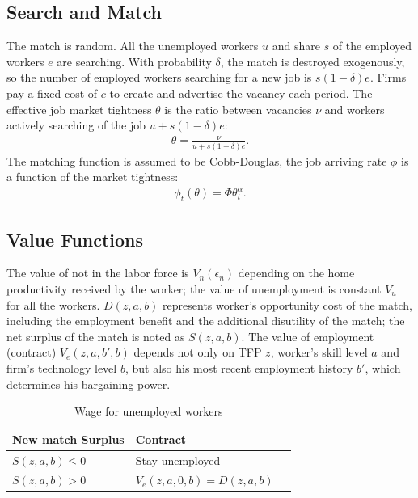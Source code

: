 \documentclass[12pt]{article}
\newcommand{\1}{\mathbb{1}}
\begin{document}
\subsection{Search and Match}
The match is random. All the unemployed workers $u$ and share $s$ of the employed workers $e$ are searching. With probability $\delta$, the match is destroyed exogenously, so the number of employed workers searching for a new job is $s(1-\delta)e$. Firms pay a fixed cost of $c$ to create and advertise the vacancy each period. 
The effective job market tightness $\theta$ is the ratio between vacancies $\nu$ and workers actively searching of the job $u+s(1-\delta)e$:
\begin{align*}
\theta = \frac{\nu}{u+s(1-\delta)e}.
\end{align*}
The matching function is assumed to be Cobb-Douglas, the job arriving rate $\phi$ is a function of the market tightness: 
\begin{align*}
\phi_t(\theta) = \Phi \theta_t^\alpha.
\end{align*}

\subsection{Value Functions}
The value of not in the labor force is $V_n(\epsilon_n)$ depending on the home productivity received by the worker; the value of unemployment is constant $V_u$ for all the workers. $D(z,a,b)$ represents worker's opportunity cost of the match, including the employment benefit and the additional disutility of the match; the net surplus of the match is noted as $S(z,a,b)$. The value of employment (contract) $V_e(z,a,b',b)$ depends not only on TFP $z$, worker's skill level $a$ and firm's technology level $b$, but also his most recent employment history $b'$, which determines his bargaining power. 

\begin{table}[h!]
\scriptsize
\begin{center}
\begin{tabular}{llc}
\hline \hline
New match Surplus & Contract  \\
\hline
$S(z,a,b) \leq 0$ &Stay unemployed \\
$S(z,a,b)>0$ &$V_e(z,a,0,b) = D(z,a,b)$ \\
\hline \hline
\end{tabular}
\end{center}
\caption{Wage for unemployed workers}
\label{Wage_UE}
\end{table}
\end{document}
